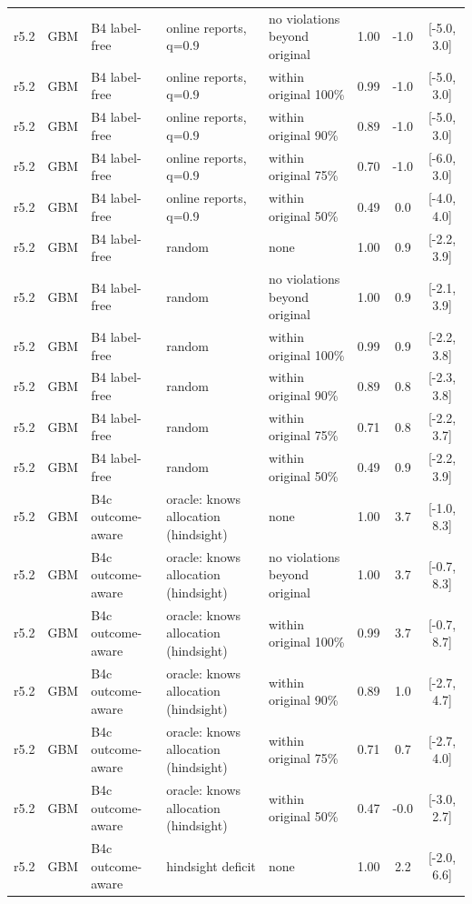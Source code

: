 \begin{longtable}{lllp{4.2cm}p{3.4cm}ccc}
r5.2 & GBM & B4 label-free & online reports, q=0.9 & no violations beyond original & 1.00 & -1.0 & [-5.0, 3.0] \\
r5.2 & GBM & B4 label-free & online reports, q=0.9 & within original 100\% & 0.99 & -1.0 & [-5.0, 3.0] \\
r5.2 & GBM & B4 label-free & online reports, q=0.9 & within original 90\% & 0.89 & -1.0 & [-5.0, 3.0] \\
r5.2 & GBM & B4 label-free & online reports, q=0.9 & within original 75\% & 0.70 & -1.0 & [-6.0, 3.0] \\
r5.2 & GBM & B4 label-free & online reports, q=0.9 & within original 50\% & 0.49 & 0.0 & [-4.0, 4.0] \\
r5.2 & GBM & B4 label-free & random & none & 1.00 & 0.9 & [-2.2, 3.9] \\
r5.2 & GBM & B4 label-free & random & no violations beyond original & 1.00 & 0.9 & [-2.1, 3.9] \\
r5.2 & GBM & B4 label-free & random & within original 100\% & 0.99 & 0.9 & [-2.2, 3.8] \\
r5.2 & GBM & B4 label-free & random & within original 90\% & 0.89 & 0.8 & [-2.3, 3.8] \\
r5.2 & GBM & B4 label-free & random & within original 75\% & 0.71 & 0.8 & [-2.2, 3.7] \\
r5.2 & GBM & B4 label-free & random & within original 50\% & 0.49 & 0.9 & [-2.2, 3.9] \\
r5.2 & GBM & B4c outcome-aware & oracle: knows allocation (hindsight) & none & 1.00 & 3.7 & [-1.0, 8.3] \\
r5.2 & GBM & B4c outcome-aware & oracle: knows allocation (hindsight) & no violations beyond original & 1.00 & 3.7 & [-0.7, 8.3] \\
r5.2 & GBM & B4c outcome-aware & oracle: knows allocation (hindsight) & within original 100\% & 0.99 & 3.7 & [-0.7, 8.7] \\
r5.2 & GBM & B4c outcome-aware & oracle: knows allocation (hindsight) & within original 90\% & 0.89 & 1.0 & [-2.7, 4.7] \\
r5.2 & GBM & B4c outcome-aware & oracle: knows allocation (hindsight) & within original 75\% & 0.71 & 0.7 & [-2.7, 4.0] \\
r5.2 & GBM & B4c outcome-aware & oracle: knows allocation (hindsight) & within original 50\% & 0.47 & -0.0 & [-3.0, 2.7] \\
r5.2 & GBM & B4c outcome-aware & hindsight deficit & none & 1.00 & 2.2 & [-2.0, 6.6] \\

\end{longtable}
